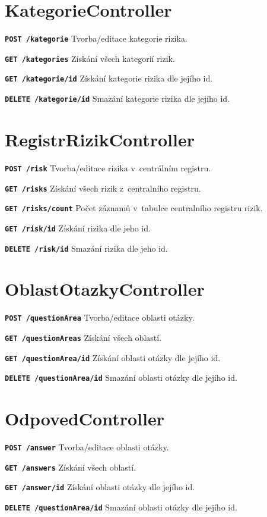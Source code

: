 \section{KategorieController}
\begin{DESCRIPTION}
\item \texttt{\textbf{POST /kategorie}} Tvorba/editace kategorie rizika.
\item \texttt{\textbf{GET /kategories}} Získání všech kategorií rizik.
\item \texttt{\textbf{GET /kategorie/{id}}} Získání kategorie rizika dle jejího id.
\item \texttt{\textbf{DELETE /kategorie/{id}}} Smazání kategorie rizika dle jejího id.
\end{DESCRIPTION}

\section{RegistrRizikController}
\begin{DESCRIPTION}
\item \texttt{\textbf{POST /risk}} Tvorba/editace rizika v~centrálním registru.
\item \texttt{\textbf{GET /risks}} Získání všech rizik z~centralního registru.
\item \texttt{\textbf{GET /risks/count}} Počet záznamů v~tabulce centralního registru rizik.
\item \texttt{\textbf{GET /risk/{id}}} Získání rizika dle jeho id.
\item \texttt{\textbf{DELETE /risk/{id}}} Smazání rizika dle jeho id.
\end{DESCRIPTION}

\section{OblastOtazkyController}
\begin{DESCRIPTION}
\item \texttt{\textbf{POST /questionArea}} Tvorba/editace oblasti otázky.
\item \texttt{\textbf{GET /questionAreas}} Získání všech oblastí.
\item \texttt{\textbf{GET /questionArea/{id}}} Získání oblasti otázky dle jejího id.
\item \texttt{\textbf{DELETE /questionArea/{id}}} Smazání oblasti otázky dle jejího id.
\end{DESCRIPTION}

\section{OdpovedController}
\begin{DESCRIPTION}
\item \texttt{\textbf{POST /answer}} Tvorba/editace oblasti otázky.
\item \texttt{\textbf{GET /answers}} Získání všech oblastí.
\item \texttt{\textbf{GET /answer/{id}}} Získání oblasti otázky dle jejího id.
\item \texttt{\textbf{DELETE /questionArea/{id}}} Smazání oblasti otázky dle jejího id.
\end{DESCRIPTION}

